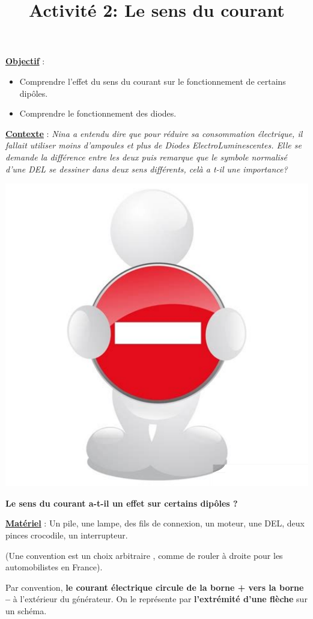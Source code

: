 \documentclass[10pt]{article}
\newcommand{\titreActivite}{Activité 2: Le sens du courant} %
\newcommand{\objectif}{ 	
	
	\begin{itemize}
		\item Comprendre l'effet du sens du courant sur le fonctionnement de certains dipôles.
		\item Comprendre le fonctionnement des diodes.
	\end{itemize}
}
\newcommand{\contexte}{
	Nina a entendu dire que pour réduire sa consommation électrique, 
	il fallait utiliser moins d'ampoules et plus de Diodes ElectroLuminescentes. 
	Elle se demande la différence entre les deux puis remarque que le symbole normalisé d'une DEL
	se dessiner dans deux sens différents, celà a t-il une importance?
}
\newcommand{\resumeContexte}{
	Le sens du courant a-t-il un effet sur certains dipôles ?
}
\begin{document}
\date{}
\title{\titreActivite}
\maketitle %


\underline{\textbf{Objectif}} :  \vspace{2pt}
\objectif

\vspace{4pt}

\underline{\textbf{Contexte}} :  \textit{\contexte}

\begin{center}
	\includegraphics[width=0.35\columnwidth]{activité.png} %
\end{center}
\textbf{\resumeContexte}


\vspace{-12pt}


\textbf{\underline{Matériel}} : Un pile, une lampe, des fils de connexion, un moteur, une DEL, deux pinces
 crocodile, un
interrupteur.


\begin{mybox}[Convention]
	(Une convention est un choix arbitraire
	, comme de rouler à droite pour les automobilistes en France). 
	
	Par convention,
	\textbf{le courant électrique circule de la borne +
	vers la borne –} à l’extérieur du générateur.
	On le représente par \textbf{l’extrémité d’une flèche} sur un schéma.

\end{mybox}
\end{document}
